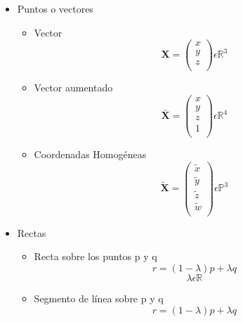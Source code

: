 \documentclass[main.tex]{subfiles}
\begin{document}
\begin{itemize}
\item Puntos o vectores
  \begin{itemize}
  \item Vector
    \begin{equation}
      \mathbf{X} = \left(
      \begin{array}{ccc}x \\y \\z \\\end{array} \right)
      \epsilon \mathbb{R}^{3}
    \end{equation}
  \item Vector aumentado
    \begin{equation}
      \mathbf{\bar{X}} = \left(
          \begin{array}{cccc}x \\y \\z \\1 \\
          \end{array}        \right) \epsilon \mathbb{R}^{4}
    \end{equation}
  \item Coordenadas Homogéneas
    \begin{equation}
      \mathbf{\tilde{X}} = \left(
          \begin{array}{ccc}
            \tilde{x} \\ \tilde{y} \\ \tilde{z} \\ \tilde{w} \\
          \end{array}
        \right) \epsilon \mathbb{P}^{3}
    \end{equation}
  \end{itemize}
\item Rectas
  \begin{itemize}
  \item Recta sobre los puntos p y q
    \begin{equation}
      r = (1 - \lambda)p + \lambda q
    \end{equation}
    \begin{equation}
      \lambda \epsilon \mathbb{R}
    \end{equation}
  \item Segmento de línea sobre p y q
    \begin{equation}
      r = (1-\lambda )p+\lambda q
    \end{equation}

\end{itemize}
\end{itemize}
\end{document}
